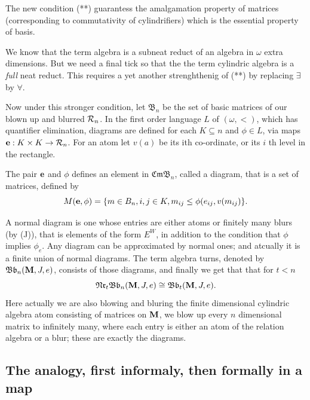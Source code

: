 \documentclass[12pt]{article}
\newtheorem{theorem}{Theorem}[section]
\theoremstyle{definition}
\def\Nr{{\mathfrak{Nr}}}
\def\B{{\mathfrak{B}}}
\def\CA{{\sf CA}}
\def\CA{{\sf CA}}
\def\B{{\sf B}}
\def\Cm{{\mathfrak{Cm}}}
\def\Nr{{\mathfrak{Nr}}}
\def\Nr{{\mathfrak{Nr}}}
\def\B{{\mathfrak{B}}}
\def\B{{\mathfrak{B}}}
\def\Bb{{\mathfrak{Bb}}}
\def\Bb{{\mathfrak{Bb}}}
\def\CA{{\sf CA}}
\begin{document}
The new condition (**)
guarantess the amalgamation property of matrices (corresponding to commutativity of
cylindrifiers)  which is the essential  property of basis.

We know that the term algebra is a subneat reduct of an algebra in $\omega$ extra dimensions.
But we need a final tick so that the the term cylindric algebra is a {\it full} neat reduct.
This requires a yet another strenghthenig of  (**) by replacing $\exists$ by $\forall$.

Now under this stronger condition, let $\B_n$ be the set of basic matrices of our blown up and blurred ${\cal R}_n$.
In the first order language $L$ of $(\omega, <)$, which has quantifier elimination,
diagrams are defined for each $K\subseteq n$ and $\phi\in L$, via maps  $\bold e:K\times K\to {\cal R}_n$.
For an atom let $v(a)$ be its ith co-ordinate, or its $i$ th level in the rectangle.

The pair $\bold e$ and $\phi$ defines an element in $\Cm\B_n$, called a diagram,
that is a set of matrices, defined by
$$M(\bold e, \phi)=\{m\in B_n, i,j\in K, m_{ij}\leq \phi(e_{ij},v(m_{ij})\}.$$

A normal diagram is one whose entries are either atoms or finitely many blurs (by (J)), that is elements of the form $E^W$,
in addition to the condition that $\phi$ implies $\phi_e$.
Any diagram can be approximated by normal ones; and atcually it is a finite union of normal diagrams.
The term algebra turns, denoted by $\Bb_n(\bold M, J, e)$, consists of those diagrams,
and finally we get  that  that for $t<n$
$$\Nr_t \Bb_n(\bold M, J, e)\cong \Bb_t(\bold M, J, e).$$
Here actually we are also blowing and bluring the finite dimensional cylindric algebra atom consisting of matrices on $\bold M$, we blow 
up every $n$ dimensional matrix to infinitely many, where each entry is either an atom of the relation algebra or a blur;
these are exactly 
the diagrams.

\subsection{The analogy, first informaly, then formally in a map}
\end{document}
